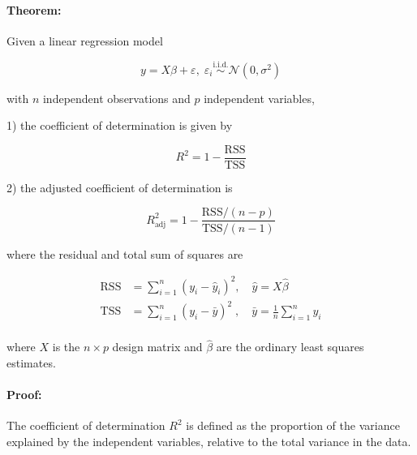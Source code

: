 

\setcounter{equation}{0}



\paragraph{Theorem:}

Given a linear regression model

\begin{equation} \label{eq:rsq-mlr}
y = X\beta + \varepsilon, \; \varepsilon_i \overset{\mathrm{i.i.d.}}{\sim} \mathcal{N}(0, \sigma^2)
\end{equation}

with $n$ independent observations and $p$ independent variables,

1) the coefficient of determination is given by

\begin{equation} \label{eq:R2}
R^2 = 1 - \frac{\mathrm{RSS}}{\mathrm{TSS}}
\end{equation}

2) the adjusted coefficient of determination is

\begin{equation} \label{eq:R2-adj}
R^2_{\mathrm{adj}} = 1 - \frac{\mathrm{RSS}/(n-p)}{\mathrm{TSS}/(n-1)}
\end{equation}

where the residual and total sum of squares are

\vspace{-0.5em}
\begin{equation} \label{eq:SS}
\begin{split}
\mathrm{RSS} &= \sum_{i=1}^{n} (y_i - \hat{y}_i)^2, \quad \hat{y} = X\hat{\beta} \\
\mathrm{TSS} &= \sum_{i=1}^{n} (y_i - \bar{y})^2\;, \quad \bar{y} = \frac{1}{n} \sum_{i=1}^n y_i \\
\end{split}
\end{equation}

where $X$ is the $n \times p$ design matrix and $\hat{\beta}$ are the ordinary least squares estimates.


\paragraph{Proof:} The coefficient of determination $R^2$ is defined as the proportion of the variance explained by the independent variables, relative to the total variance in the data.

